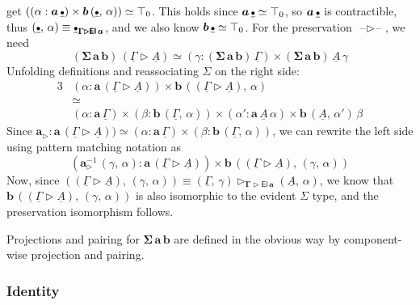 \documentclass[12pt,a4paper,twoside,openany]{book}
\theoremstyle{remark}
\theoremstyle{definition}
\theoremstyle{theorem}
\newcommand{\bs}[1]{\boldsymbol{#1}}
\newcommand{\refl}{\mathsf{refl}}
\newcommand{\El}{\mathsf{El}}
\newcommand{\blank}{\mathord{\hspace{1pt}\text{--}\hspace{1pt}}}
\newcommand{\ext}{\triangleright}
\newcommand{\emptycon}{\scaleobj{.75}\bullet}
\newcommand{\ba}{\bs{a}}
\newcommand{\bb}{\bs{b}}
\newcommand{\ul}[1]{\underline{#1}}
\newcommand{\ulGamma}{\ul{\Gamma}}
\newcommand{\ulemptycon}{\ul{\emptycon}}
\newcommand{\ult}{\ul{t}}
\newcommand{\ulA}{\ul{A}}
\newcommand{\defn}{:\equiv}
\begin{document}
get $((\alpha : \ba\,\ulemptycon) \times \bb\,(\ulemptycon,\,\alpha)) \simeq
\top_0$. This holds since $\ba\,\ulemptycon \simeq \top_0$, so
$\ba\,\ulemptycon$ is contractible, thus $(\ulemptycon,\,\alpha) \equiv
\ulemptycon_{\bs{\Gamma \ext \El\,a}}$, and we also know $\bb\,\ulemptycon
\simeq \top_0$. For the preservation $\blank\!\ext\!\blank$, we need
\[
(\bs{\Sigma\,a\,b})\,(\ulGamma \ext \ulA) \simeq (\gamma : (\bs{\Sigma\,a\,b})\,\ulGamma) \times
  (\bs{\Sigma\,a\,b})\,\ulA\,\gamma
\]
Unfolding definitions and reassociating $\Sigma$ on the right side:
\begin{alignat*}{3}
   &(\alpha : \ba\,(\ulGamma \ext \ulA)) \times \bb\,((\ulGamma \ext \ulA),\,\alpha) \\
   &\simeq \\
   &(\alpha : \ba\,\ulGamma)
           \times (\beta : \bb\,(\ulGamma,\,\alpha))
           \times (\alpha' : \ba\,\ulA\,\alpha)
           \times \bb\,(\ulA,\,\alpha')\,\beta
\end{alignat*}
Since $\ba_{\ext} : \ba\,(\ulGamma \ext \ulA)) \simeq (\alpha : \ba\,\ulGamma)
\times (\beta : \bb\,(\ulGamma,\,\alpha))$, we can rewrite the left side using
pattern matching notation as
\[
  (\ba_{\ext}^{-1}\,(\gamma,\,\alpha) : \ba\,(\ulGamma \ext \ulA))
     \times \bb\,((\ulGamma \ext \ulA),\,(\gamma,\,\alpha))
\]
Now, since $((\ulGamma \ext \ulA),\,(\gamma,\,\alpha)) \equiv (\ulGamma,\,\gamma)
\ext_{\bs{\Gamma\ext\El\,a}} (\ulA,\,\alpha)$, we know that $\bb\,((\ulGamma
\ext \ulA),\,(\gamma,\,\alpha))$ is also isomorphic to the evident $\Sigma$
type, and the preservation isomorphism follows.

Projections and pairing for $\bs{\Sigma\,a\,b}$ are defined in the obvious way by
component-wise projection and pairing.











\subsubsection{Identity}
\end{document}
